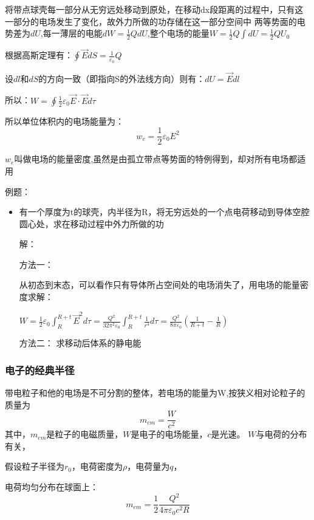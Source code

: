 \documentclass[11pt]{ctexart}
\begin{document}
将带点球壳每一部分从无穷远处移动到原处，在移动dx段距离的过程中，只有这一部分的电场发生了变化，故外力所做的功存储在这一部分空间中
两等势面的电势差为$dU$,每一薄层的电能$dW=\frac{1}{2} QdU$,整个电场的能量$W=\frac{1}{2}Q \int dU=\frac{1}{2}QU_0$

根据高斯定理有：$\oint \vec{E}dS=\frac{1}{\varepsilon_0} Q$

设$dl$和$dS$的方向一致（即指向S的外法线方向）则有：$dU=\vec{E} dl$

所以：$W=\oint \frac{1}{2}\varepsilon_0 \vec{E} \cdot \vec{E}d\tau$

所以单位体积内的电场能量为：
\begin{equation}
w_e=\frac{1}{2} \varepsilon_0 E^2
\end{equation}

$w_e$叫做电场的能量密度,虽然是由孤立带点等势面的特例得到，却对所有电场都适用

例题：

\begin{itemize}
\item 有一个厚度为t的球壳，内半径为R，将无穷远处的一个点电荷移动到导体空腔圆心处，求在移动过程中外力所做的功

解：

方法一：

    从初态到末态，可以看作只有导体所占空间处的电场消失了，用电场的能量密度求解：

$W=\frac{1}{2} \varepsilon_0 \int_R^{R+t}\vec{E}^2 d\tau 
=\frac{Q^2}{32 \pi^2 \varepsilon_0} \int_R^{R+t}\frac{1}{r^4} d\tau 
=\frac{Q^2}{8 \pi \varepsilon_0}(\frac{1}{R+t}-\frac{1}{R})$

方法二：
    求移动后体系的静电能

\end{itemize}
\subsubsection{电子的经典半径}
带电粒子和他的电场是不可分割的整体，若电场的能量为W,按狭义相对论粒子的质量为
\begin{equation}
m_{em}=\frac{W}{c^2}
\end{equation}
其中，$m_{em}$是粒子的电磁质量，$W$是电子的电场能量，$c$是光速。
$W$与电荷的分布有关，

假设粒子半径为$r_0$，电荷密度为$\rho$，电荷量为$q$，

电荷均匀分布在球面上：
\begin{equation}
    m_{em}=\frac{1}{2} \frac{Q^2}{4 \pi \varepsilon_0 c^2 R}
\end{equation}
\end{document}
